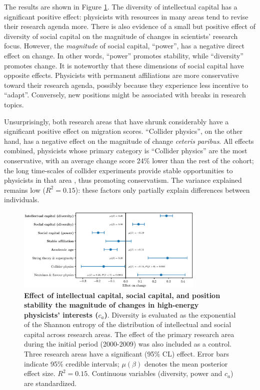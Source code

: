 \documentclass{article}
\begin{document}
The results are shown in Figure \ref{fig:change_score_effect}. The diversity of intellectual capital has a significant positive effect: physicists with resources in many areas tend to revise their research agenda more. There is also evidence of a small but positive effect of diversity of social capital on the magnitude of changes in scientists' research focus. However, the \textit{magnitude} of social capital, ``power'', has a negative direct effect on change. In other words, ``power'' promotes stability, while ``diversity'' promotes change. It is noteworthy that these dimensions of social capital have opposite effects. Physicists with permanent affiliations are more conservative toward their research agenda, possibly because they experience less incentive to ``adapt''. Conversely, new positions might be associated with breaks in research topics.

Unsurprisingly, both research areas that have shrunk considerably have a significant positive effect on migration scores. ``Collider physics'', on the other hand, has a negative effect on the magnitude of change \textit{ceteris paribus}. All effects combined, physicists whose primary category is ``Collider physics'' are the most conservative, with an average change score 24\% lower than the rest of the cohort; the long time-scales of collider experiments provide stable opportunities to physicists in that area \citep[p.~138]{galison1987how}, thus promoting conservatism. The variance explained remains low ($R^2=0.15$): these factors only partially explain differences between individuals.

\begin{figure}[h]
    \centering
    \includegraphics[width=0.8\textwidth]{Fig5.eps}
    \caption{\textbf{Effect of intellectual capital, social capital, and position stability the magnitude of changes in high-energy physicists' interests ($c_a$)}. Diversity is evaluated as the exponential of the Shannon entropy of the distribution of intellectual and social capital across research areas. The effect of the primary research area during the initial period (2000-2009) was also included as a control. Three research areas have a significant (95\% CL) effect. Error bars indicate 95\% credible intervals; $\mu(\beta)$ denotes the mean posterior effect size. $R^2=0.15$. Continuous variables (diversity, power and $c_a$) are standardized.}
    \label{fig:change_score_effect}
\end{figure}
\end{document}
